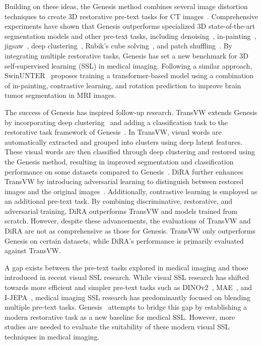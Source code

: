 \documentclass[a4paper,11pt,oneside]{report}
\begin{document}
Building on these ideas, the Genesis method combines several image distortion techniques to create 3D restorative pre-text tasks for CT images~\cite{Zhou2021}. Comprehensive experiments have shown that Genesis outperforms specialized 3D state-of-the-art segmentation models and other pre-text tasks, including denoising~\cite{Vincent2010}, in-painting~\cite{Pathak2016}, jigsaw~\cite{Noroozi2016}, deep clustering~\cite{Caron2018}, Rubik's cube solving~\cite{Zhuang2019}, and patch shuffling~\cite{Chen2019}. By integrating multiple restorative tasks, Genesis has set a new benchmark for 3D self-supervised learning (SSL) in medical imaging.  Following a similar approach, SwinUNTER~\cite{Tang2022} proposes training a transformer-based model using a combination of in-painting, contrastive learning, and rotation prediction to improve brain tumor segmentation in MRI images.

The success of Genesis has inspired follow-up research. TransVW extends Genesis by incorporating deep clustering~\cite{Caron2018} and adding a classification task to the restorative task framework of Genesis~\cite{Zhou2021}. In TransVW, visual words are automatically extracted and grouped into clusters using deep latent features. These visual words are then classified through deep clustering and restored using the Genesis method, resulting in improved segmentation and classification performance on some datasets compared to Genesis~\cite{Haghighi2021}. DiRA further enhances TransVW by introducing adversarial learning to distinguish between restored images and the original images~\cite{Haghighi2024}. Additionally, contrastive learning is employed as an additional pre-text task. By combining discriminative, restorative, and adversarial training, DiRA outperforms TransVW and models trained from scratch. However, despite these advancements, the evaluations of TransVW and DiRA are not as comprehensive as those for Genesis. TransVW only outperforms Genesis on certain datasets, while DiRA's performance is primarily evaluated against TransVW.

A gap exists between the pre-text tasks explored in medical imaging and those introduced in recent visual SSL research. While visual SSL research has shifted towards more efficient and simpler pre-text tasks such as DINOv2~\cite{Oquab2024dinov}, MAE~\cite{He2022}, and I-JEPA~\cite{Assran2023}, medical imaging SSL research has predominantly focused on blending multiple pre-text tasks. Genesis~\cite{Zhou2021} attempts to bridge this gap by establishing a modern restorative task as a new baseline for medical SSL. However, more studies are needed to evaluate the suitability of these modern visual SSL techniques in medical imaging. 
\end{document}
